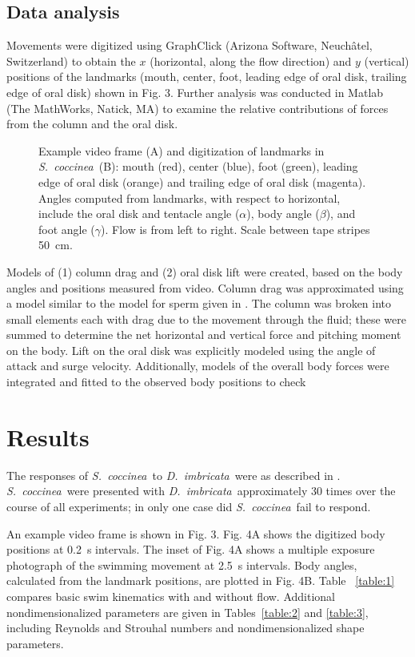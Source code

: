 \documentclass[10pt]{article}
\newcommand{\Genus}[1]{\emph{#1}}
\newcommand{\Stomphia}{\Genus{S.~coccinea}}
\newcommand{\Dimbricata}{\Genus{D.~imbricata}}
\begin{document}
\subsection*{Data analysis}
	Movements were digitized using GraphClick (Arizona Software, Neuch\^{a}tel, Switzerland) to obtain the $x$ (horizontal, along the flow direction) and $y$ (vertical) positions of the landmarks (mouth, center, foot, leading edge of oral disk, trailing edge of oral disk) shown in Fig. 3.  Further analysis was conducted in Matlab (The MathWorks, Natick, MA) to examine the relative contributions of forces from the column and the oral disk.  

\begin{figure}
\caption{Example video frame (A) and digitization of landmarks in \Stomphia~(B): mouth (red), center (blue), foot (green), leading edge of oral disk (orange) and trailing edge of oral disk (magenta).  Angles computed from landmarks, with respect to horizontal, include the oral disk and tentacle angle ($\alpha$), body angle ($\beta$), and foot angle ($\gamma$). Flow is from left to right.  Scale between tape stripes \SI{50}{\centi\meter}. }
\label{fig:3}
\end{figure}
	
Models of (1) column drag and (2) oral disk lift were created, based on the body angles and positions measured from video.  Column drag was approximated using a model similar to the model for sperm given in \citep{Gray:1955}.  The column was broken into small elements each with drag due to the movement through the fluid; these were summed to determine the net horizontal and vertical force and pitching moment on the body.  Lift on the oral disk was explicitly modeled using the angle of attack and surge velocity.   Additionally, models of the overall body forces were integrated and fitted to the observed body positions to check 

\section*{Results}
	The responses of \Stomphia\ to \Dimbricata\ were as described in \citep{Yentsch:1955, Sund:1958, Robson:1961}.  \Stomphia\ were presented with \Dimbricata\ approximately 30 times over the course of all experiments; in only one case did \Stomphia\ fail to respond. 
	
An example video frame is shown in Fig. 3.  Fig. 4A shows the digitized body positions at \SI{0.2}{\second} intervals.  The inset of Fig. 4A shows a multiple exposure photograph of the swimming movement at \SI{2.5}{\second} intervals.  Body angles, calculated from the landmark positions, are plotted in Fig. 4B.  Table ~\ref{table:1} compares basic swim kinematics with and without flow.  Additional nondimensionalized parameters are given in Tables~\ref{table:2} and \ref{table:3}, including Reynolds and Strouhal numbers and nondimensionalized shape parameters.
\end{document}
